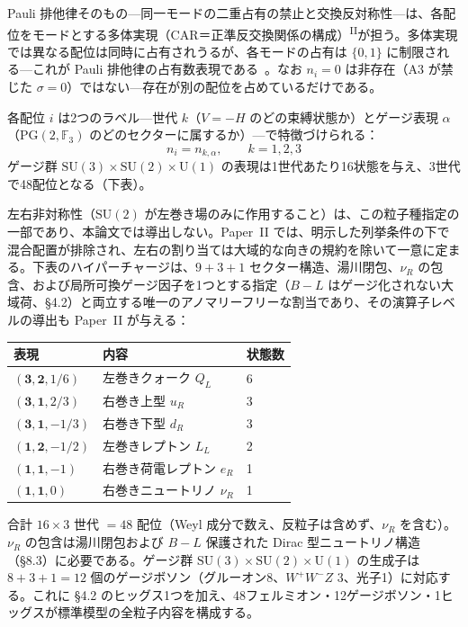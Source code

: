 \documentclass[fontsize=11pt,paper=a4,lualatex]{jlreq}
\newcommand{\PII}{\textsuperscript{\textup{II}}}
\begin{document}
Pauli 排他律そのもの---同一モードの二重占有の禁止と交換反対称性---は、各配位をモードとする多体実現（CAR＝正準反交換関係の構成）\PII{}が担う。多体実現では異なる配位は同時に占有されうるが、各モードの占有は $\{0,1\}$ に制限される---これが Pauli 排他律の占有数表現である~\cite{pauli}。なお $n_i = 0$ は非存在（A3 が禁じた $\sigma = 0$）ではない---存在が別の配位を占めているだけである。

各配位 $i$ は2つのラベル---世代 $k$（$V = -H$ のどの束縛状態か）とゲージ表現 $\alpha$（$\mathrm{PG}(2, \mathbb{F}_3)$ のどのセクターに属するか）---で特徴づけられる：
\[n_i = n_{k,\alpha},\qquad k = 1, 2, 3\]
ゲージ群 $\mathrm{SU}(3){\times}\mathrm{SU}(2){\times}\mathrm{U}(1)$ の表現は1世代あたり16状態を与え、3世代で48配位となる（下表）。

左右非対称性（$\mathrm{SU}(2)$ が左巻き場のみに作用すること）は、この粒子種指定の一部であり、本論文では導出しない。Paper~II では、明示した列挙条件の下で混合配置が排除され、左右の割り当ては大域的な向きの規約を除いて一意に定まる。下表のハイパーチャージは、$9{+}3{+}1$ セクター構造、湯川閉包、$\nu_R$ の包含、および局所可換ゲージ因子を1つとする指定（$B{-}L$ はゲージ化されない大域荷、§4.2）と両立する唯一のアノマリーフリーな割当であり、その演算子レベルの導出も Paper~II が与える：

\vspace*{0.55\baselineskip}
\begin{center}
\small
\renewcommand{\arraystretch}{1.15}
\begin{tabular}{@{}l@{\qquad}l@{\qquad}l@{}}
\toprule
表現 & 内容 & 状態数 \\
\midrule
$(\mathbf{3}, \mathbf{2}, 1/6)$ & 左巻きクォーク $Q_L$ & 6 \\
$(\mathbf{3}, \mathbf{1}, 2/3)$ & 右巻き上型 $u_R$ & 3 \\
$(\mathbf{3}, \mathbf{1}, {-}1/3)$ & 右巻き下型 $d_R$ & 3 \\
$(\mathbf{1}, \mathbf{2}, {-}1/2)$ & 左巻きレプトン $L_L$ & 2 \\
$(\mathbf{1}, \mathbf{1}, {-}1)$ & 右巻き荷電レプトン $e_R$ & 1 \\
$(\mathbf{1}, \mathbf{1}, 0)$ & 右巻きニュートリノ $\nu_R$ & 1 \\
\bottomrule
\end{tabular}
\end{center}
\vspace*{0.35\baselineskip}

\noindent 合計 $16 \times 3$ 世代 $= 48$ 配位（Weyl 成分で数え、反粒子は含めず、$\nu_R$ を含む）。$\nu_R$ の包含は湯川閉包および $B{-}L$ 保護された Dirac 型ニュートリノ構造（§8.3）に必要である。ゲージ群 $\mathrm{SU}(3){\times}\mathrm{SU}(2){\times}\mathrm{U}(1)$ の生成子は $8{+}3{+}1 = 12$ 個のゲージボソン（グルーオン8、$W^+W^-Z$ 3、光子1）に対応する。これに §4.2 のヒッグス1つを加え、48フェルミオン・12ゲージボソン・1ヒッグスが標準模型の全粒子内容を構成する。
\end{document}
